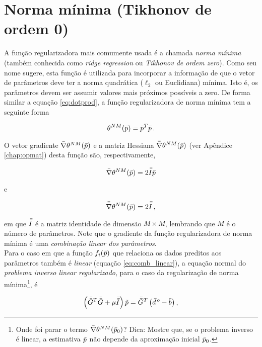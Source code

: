 \section{Norma mínima (Tikhonov de ordem 0)}

A função regularizadora mais comumente usada é a chamada {\it norma mínima}
(também conhecida como {\it ridge regression} ou {\it Tikhonov de ordem zero}).
Como seu nome sugere, esta função é utilizada para incorporar a informação de
que o vetor de parâmetros deve ter a norma quadrática ($\ell_2$ ou Euclidiana)
mínima.
Isto é, os parâmetros devem ser assumir valores mais próximos possíveis a zero.
De forma similar a equação \ref{eq:dotprod}, a função regularizadora de norma
mínima tem a seguinte forma

\begin{equation}
\theta^{NM}(\bar{p}) = \bar{p}^T\bar{p} \thinspace .
\label{eq:norma_minima}
\end{equation}

\indent O vetor gradiente $\bar{\nabla}\theta^{NM}(\bar{p})$ e a matriz Hessiana
$\bar{\bar{\nabla}}\theta^{NM}(\bar{p})$ (ver Apêndice \ref{chap:opmat}) desta função
são, respectivamente,

\begin{equation}
\bar{\nabla}\theta^{NM}(\bar{p}) = 2\bar{\bar{I}}\bar{p}
\label{eq:grad_norma_minima}
\end{equation}

\noindent e

\begin{equation}
\bar{\bar{\nabla}}\theta^{NM}(\bar{p}) = 2\bar{\bar{I}} \thinspace ,
\label{eq:hessian_norma_minima}
\end{equation}

\noindent em que $\bar{\bar{I}}$ é a matriz identidade de dimensão $M \times M$,
lembrando que $M$ é o número de parâmetros.
Note que o gradiente da função regularizadora de norma mínima é uma
{\it combinação linear dos parâmetros}.
\\
\indent Para o caso em que a função $f_i(\bar{p})$ que relaciona
os dados preditos aos parâmetros também é {\it linear} (equação \ref{eq:comb_linear}),
a equação normal do {\it problema inverso linear regularizado},
para o caso da regularização de norma mínima\footnote{
Onde foi parar o termo $\bar{\nabla}\theta^{NM}(\bar{p}_0)$? Dica: Mostre que, se o
problema inverso é linear, a estimativa $\tilde{p}$ não depende da aproximação
inicial $\bar{p}_0$.}, é

\begin{equation}
\left(\bar{\bar{G}}^T\bar{\bar{G}} + \mu\bar{\bar{I}}\right)\tilde{p} =
    \bar{\bar{G}}^T\left(\bar{d}^{\thinspace o} - \bar{b} \right) ,
\label{eq:sistema_normal_norma_min_linear}
\end{equation}

